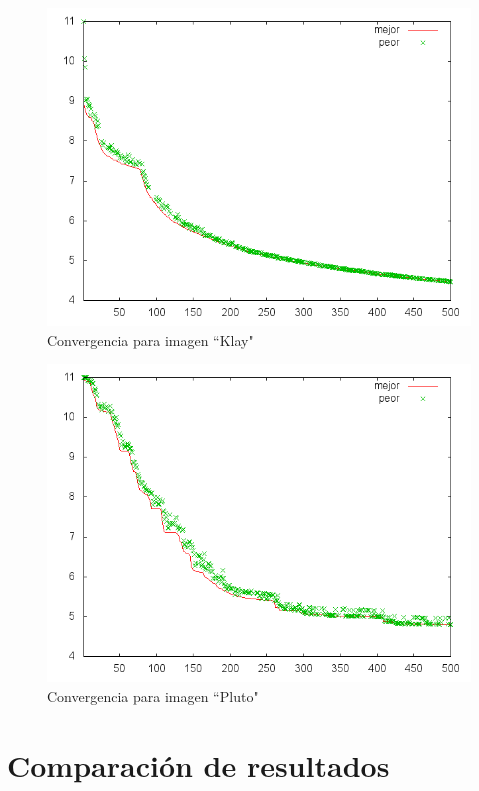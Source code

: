 \begin{figure}[b]
    \includegraphics[width=1.0\textwidth]{plot_klay}
    \caption{Convergencia para imagen ``Klay"}
    \label{img:plot-klay}
\end{figure}

\begin{figure}[b]
    \includegraphics[width=1.0\textwidth]{plot_pluto}
    \caption{Convergencia para imagen ``Pluto"}
    \label{img:plot-pluto}
\end{figure}

\section{Comparación de resultados} \label{sec:resultados}

